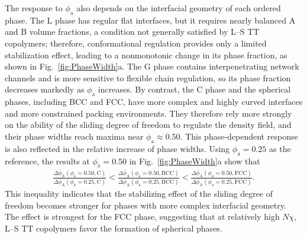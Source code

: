 The response to $\phi_{\mathrm a}$ also depends on the interfacial geometry of each ordered phase.
The L phase has regular flat interfaces, but it requires nearly balanced A and B volume fractions, a condition not generally satisfied by L--S TT copolymers; therefore, conformational regulation provides only a limited stabilization effect, leading to a nonmonotonic change in its phase fraction, as shown in Fig.~\ref{fig:PhaseWidth}a.
The G phase contains interpenetrating network channels and is more sensitive to flexible chain regulation, so its phase fraction decreases markedly as $\phi_{\mathrm a}$ increases.
By contrast, the C phase and the spherical phases, including BCC and FCC, have more complex and highly curved interfaces and more constrained packing environments.
They therefore rely more strongly on the ability of the sliding degree of freedom to regulate the density field, and their phase widths reach maxima near $\phi_{\mathrm a}\approx0.50$.
This phase-dependent response is also reflected in the relative increase of phase widths.
Using $\phi_{\mathrm a}=0.25$ as the reference, the results at $\phi_{\mathrm a}=0.50$ in Fig.~\ref{fig:PhaseWidth}a show that
\begin{equation}
    \begin{split}
        \frac{\Delta \bar{\phi}_{\mathrm{A}}(\phi_{\mathrm{a}}=0.50,\mathrm{C})}
        {\Delta \bar{\phi}_{\mathrm{A}}(\phi_{\mathrm{a}}=0.25,\mathrm{C})} <
        \frac{\Delta \bar{\phi}_{\mathrm{A}}(\phi_{\mathrm{a}}=0.50,\mathrm{BCC})}
        {\Delta \bar{\phi}_{\mathrm{A}}(\phi_{\mathrm{a}}=0.25,\mathrm{BCC})} 
        <
        \frac{\Delta \bar{\phi}_{\mathrm{A}}(\phi_{\mathrm{a}}=0.50,\mathrm{FCC})}
        {\Delta \bar{\phi}_{\mathrm{A}}(\phi_{\mathrm{a}}=0.25,\mathrm{FCC})}.
    \end{split}
\end{equation}
This inequality indicates that the stabilizing effect of the sliding degree of freedom becomes stronger for phases with more complex interfacial geometry.
The effect is strongest for the FCC phase, suggesting that at relatively high $N\chi$, L--S TT copolymers favor the formation of spherical phases.


